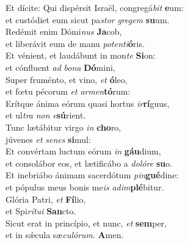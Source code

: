 \evenverse Et dícite: Qui dispérsit Israël, congregá\textit{bit} \textbf{e}um:~\*\\
\evenverse et custódiet eum sicut pa\textit{stor} \textit{gre}\textit{gem} \textbf{su}um.\\
\oddverse Redémit enim Dómi\textit{nus} \textbf{Ja}cob,~\*\\
\oddverse et liberávit eum de manu \textit{po}\textit{ten}\textit{ti}\textbf{ó}ris.\\
\evenverse Et vénient, et laudábunt in mon\textit{te} \textbf{Si}on:~\*\\
\evenverse et cónfluent \textit{ad} \textit{bo}\textit{na} \textbf{Dó}mini,\\
\oddverse Super fruménto, et vino, \textit{et} \textbf{ó}leo,~\*\\
\oddverse et fœtu pécorum \textit{et} \textit{ar}\textit{men}\textbf{tó}rum:\\
\evenverse Erítque ánima eórum quasi hortus \textit{ir}\textbf{rí}guus,~\*\\
\evenverse et ul\textit{tra} \textit{non} \textit{e}\textbf{sú}rient.\\
\oddverse Tunc lætábitur virgo \textit{in} \textbf{cho}ro,~\*\\
\oddverse júvenes \textit{et} \textit{se}\textit{nes} \textbf{si}mul:\\
\evenverse Et convértam luctum eórum \textit{in} \textbf{gáu}dium,~\*\\
\evenverse et consolábor eos, et lætificábo a \textit{do}\textit{ló}\textit{re} \textbf{su}o.\\
\oddverse Et inebriábo ánimam sacerdótum \textit{pin}\textbf{gué}dine:~\*\\
\oddverse et pópulus meus bonis me\textit{is} \textit{a}\textit{dim}\textbf{plé}bitur.\\
\evenverse Glória Patri, \textit{et} \textbf{Fí}lio,~\*\\
\evenverse et Spi\textit{rí}\textit{tu}\textit{i} \textbf{San}cto.\\
\oddverse Sicut erat in princípio, et nunc, \textit{et} \textbf{sem}per,~\*\\
\oddverse et in sǽcula sæ\textit{cu}\textit{ló}\textit{rum}. \textbf{A}men.\\

